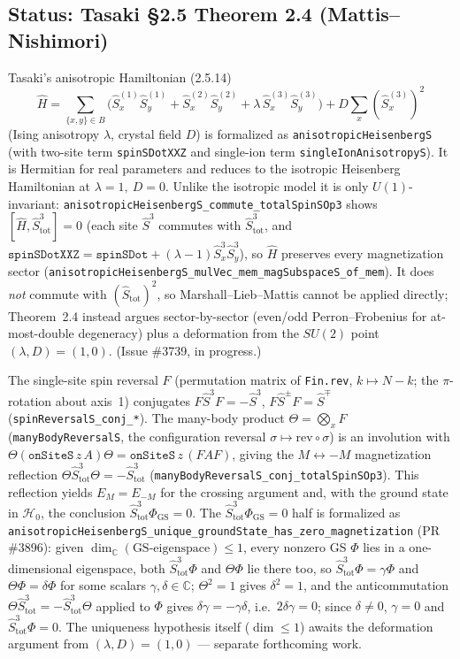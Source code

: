 \documentclass[a4paper,11pt]{article}
\begin{document}
\subsection*{Status: Tasaki §2.5 Theorem 2.4 (Mattis--Nishimori)}
\label{subsec:tasaki-2-5-theorem-2-4}

Tasaki's anisotropic Hamiltonian (2.5.14)
\[
  \hat H = \sum_{\{x,y\}\in B} \bigl(\hat S^{(1)}_x\hat S^{(1)}_y
    + \hat S^{(2)}_x\hat S^{(2)}_y + \lambda\,\hat S^{(3)}_x\hat S^{(3)}_y\bigr)
    + D\sum_{x}(\hat S^{(3)}_x)^2
\]
(Ising anisotropy \(\lambda\), crystal field \(D\)) is formalized as
\texttt{anisotropicHeisenbergS} (with two-site term \texttt{spinSDotXXZ} and
single-ion term \texttt{singleIonAnisotropyS}).  It is Hermitian for real
parameters and reduces to the isotropic Heisenberg Hamiltonian at
\(\lambda=1,\ D=0\).  Unlike the isotropic model it is only
\(U(1)\)-invariant: \texttt{anisotropicHeisenbergS\_commute\_totalSpinSOp3}
shows \([\hat H,\hat S^3_{\mathrm{tot}}]=0\) (each site \(\hat S^3\) commutes
with \(\hat S^3_{\mathrm{tot}}\), and
\(\texttt{spinSDotXXZ}=\texttt{spinSDot}+(\lambda-1)\hat S^3_x\hat S^3_y\)),
so \(\hat H\) preserves every magnetization sector
(\texttt{anisotropicHeisenbergS\_mulVec\_mem\_magSubspaceS\_of\_mem}).  It does
\emph{not} commute with \((\hat S_{\mathrm{tot}})^2\), so Marshall--Lieb--Mattis
cannot be applied directly; Theorem~2.4 instead argues sector-by-sector
(even/odd Perron--Frobenius for at-most-double degeneracy) plus a deformation
from the \(SU(2)\) point \((\lambda,D)=(1,0)\). (Issue \#3739, in progress.)

The single-site spin reversal \(F\) (permutation matrix of \texttt{Fin.rev},
\(k\mapsto N-k\); the \(\pi\)-rotation about axis~1) conjugates
\(F\hat S^3F=-\hat S^3\), \(F\hat S^\pm F=\hat S^\mp\)
(\texttt{spinReversalS\_conj\_*}).  The many-body product
\(\Theta=\bigotimes_xF\) (\texttt{manyBodyReversalS}, the configuration
reversal \(\sigma\mapsto\mathrm{rev}\circ\sigma\)) is an involution with
\(\Theta(\texttt{onSiteS}\,z\,A)\Theta=\texttt{onSiteS}\,z\,(FAF)\), giving the
\(M\leftrightarrow-M\) magnetization reflection
\(\Theta\hat S^3_{\mathrm{tot}}\Theta=-\hat S^3_{\mathrm{tot}}\)
(\texttt{manyBodyReversalS\_conj\_totalSpinSOp3}).  This reflection yields
\(E_M=E_{-M}\) for the crossing argument and, with the ground state in
\(\mathcal H_0\), the conclusion \(\hat S^3_{\mathrm{tot}}\Phi_{\mathrm{GS}}=0\).
The \(\hat S^3_{\mathrm{tot}}\Phi_{\mathrm{GS}}=0\) half is formalized as
\texttt{anisotropicHeisenbergS\_unique\_groundState\_has\_zero\_magnetization}
(PR \#3896): given \(\dim_{\mathbb C}(\text{GS-eigenspace})\le 1\), every nonzero
GS \(\Phi\) lies in a one-dimensional eigenspace, both \(\hat
S^3_{\mathrm{tot}}\Phi\) and \(\Theta\Phi\) lie there too, so
\(\hat S^3_{\mathrm{tot}}\Phi=\gamma\Phi\) and \(\Theta\Phi=\delta\Phi\) for some
scalars \(\gamma,\delta\in\mathbb C\); \(\Theta^2=1\) gives \(\delta^2=1\), and the
anticommutation \(\Theta\hat S^3_{\mathrm{tot}}=-\hat S^3_{\mathrm{tot}}\Theta\)
applied to \(\Phi\) gives \(\delta\gamma=-\gamma\delta\), i.e.\ \(2\delta\gamma=0\);
since \(\delta\ne 0\), \(\gamma=0\) and \(\hat S^3_{\mathrm{tot}}\Phi=0\).  The
uniqueness hypothesis itself (\(\dim\le 1\)) awaits the deformation argument from
\((\lambda,D)=(1,0)\) — separate forthcoming work.
\end{document}
